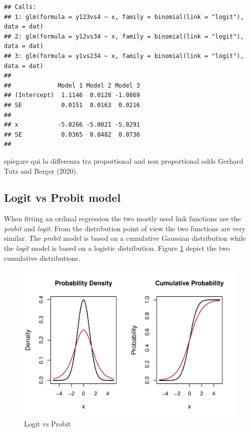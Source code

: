 \documentclass[
  man,floatsintext]{apa6}
\begin{document}
\begin{verbatim}
## Calls:
## 1: glm(formula = y123vs4 ~ x, family = binomial(link = "logit"), data = dat)
## 2: glm(formula = y12vs34 ~ x, family = binomial(link = "logit"), data = dat)
## 3: glm(formula = y1vs234 ~ x, family = binomial(link = "logit"), data = dat)
## 
##             Model 1 Model 2 Model 3
## (Intercept)  1.1146  0.0128 -1.0869
## SE           0.0151  0.0163  0.0216
##                                    
## x           -5.0266 -5.0021 -5.0291
## SE           0.0365  0.0482  0.0736
## 
\end{verbatim}

\normalsize

spiegare qui la differenza tra proportional and non proportional odds Gerhard Tutz and Berger (2020).

\subsection{Logit vs Probit model}\label{logit-vs-probit-model}

When fitting an ordinal regression the two mostly used link functions are the \emph{probit} and \emph{logit}. From the distribution point of view the two functions are very similar. The \emph{probit} model is based on a cumulative Gaussian distribution while the \emph{logit} model is based on a logistic distribution. Figure \ref{fig:logit-vs-probit} depict the two cumulative distributions.

\scriptsize

\begin{figure}

{\centering \includegraphics{paper-new_files/figure-latex/logit-vs-probit-1} 

}

\caption{Logit vs Probit}\label{fig:logit-vs-probit}
\end{figure}
\end{document}
